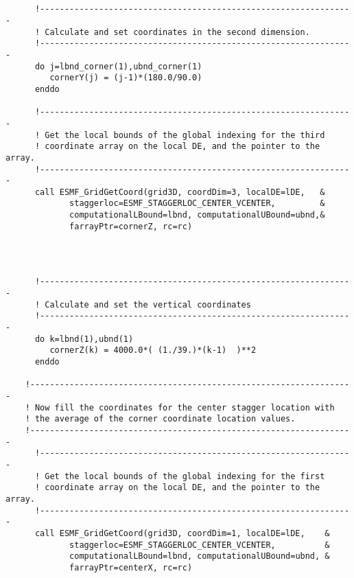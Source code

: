 
 \begin{verbatim}


      !----------------------------------------------------------------
      ! Calculate and set coordinates in the second dimension.
      !----------------------------------------------------------------
      do j=lbnd_corner(1),ubnd_corner(1)
         cornerY(j) = (j-1)*(180.0/90.0)
      enddo

      !----------------------------------------------------------------
      ! Get the local bounds of the global indexing for the third
      ! coordinate array on the local DE, and the pointer to the array.
      !----------------------------------------------------------------
      call ESMF_GridGetCoord(grid3D, coordDim=3, localDE=lDE,   &
             staggerloc=ESMF_STAGGERLOC_CENTER_VCENTER,         &
             computationalLBound=lbnd, computationalUBound=ubnd,&
             farrayPtr=cornerZ, rc=rc)
 
\end{verbatim}
 

 \begin{verbatim}


      !----------------------------------------------------------------
      ! Calculate and set the vertical coordinates
      !----------------------------------------------------------------
      do k=lbnd(1),ubnd(1)
         cornerZ(k) = 4000.0*( (1./39.)*(k-1)  )**2
      enddo

    !------------------------------------------------------------------
    ! Now fill the coordinates for the center stagger location with
    ! the average of the corner coordinate location values.
    !------------------------------------------------------------------
      !----------------------------------------------------------------
      ! Get the local bounds of the global indexing for the first
      ! coordinate array on the local DE, and the pointer to the array.
      !----------------------------------------------------------------
      call ESMF_GridGetCoord(grid3D, coordDim=1, localDE=lDE,    &
             staggerloc=ESMF_STAGGERLOC_CENTER_VCENTER,          &
             computationalLBound=lbnd, computationalUBound=ubnd, &
             farrayPtr=centerX, rc=rc)
 
\end{verbatim}
 
